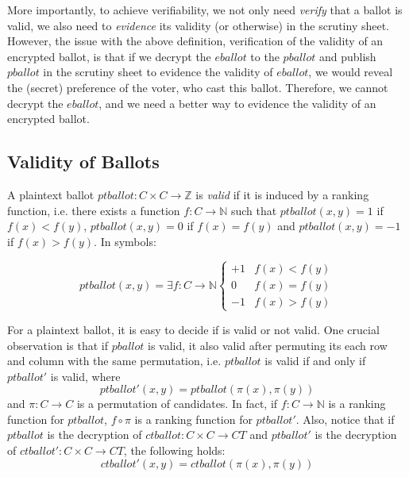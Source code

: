 \noindent
More importantly,  to achieve verifiability, we not only need \emph{verify}
that a ballot is valid, we also need to \emph{evidence} its validity
(or otherwise) in the scrutiny sheet.   However,  the issue with the above 
definition,  verification of the validity of an encrypted ballot, is that if we decrypt 
the $eballot$ to the $pballot$ and publish $pballot$  in the scrutiny sheet 
to evidence the validity of $eballot$,   
we would reveal the (secret) preference of the voter,  who cast this ballot. 
Therefore, we cannot decrypt the $eballot$, and we need a better way to evidence 
the validity of an encrypted ballot. 


\subsection{Validity of Ballots}
\label{sec:valid-pb}
A plaintext ballot $ptballot : C \times C \to \mathbb{Z}$ 
is \emph{valid} if it is induced by a ranking function, i.e.
there exists a function $f: C \to \mathbb{N}$ such that $ptballot(x, y) = 1$ if
$f(x) < f(y)$, $ptballot(x, y) = 0$ if $f(x) = f(y)$ and $ptballot(x, y) = -1$ if
$f(x) > f(y)$.  In symbols:

\[ ptballot(x, y) =  \exists f : C \to \mathbb{N}  \begin{cases} +1 & f(x) < f(y) \\ 0 &
f(x) = f(y) \\ -1 & f(x) > f(y) \end{cases} \]



\noindent
For a plaintext ballot, it is easy to decide if is valid 
or not valid.  One crucial observation is that if $pballot$ is valid, 
it also valid after permuting its each row and column with the 
same permutation, i.e.  $ptballot$ is valid if and only if $ptballot'$ is 
valid, where
\[ ptballot'(x,y) = ptballot(\pi(x), \pi(y)) \]
and $\pi: C \to C$ is a permutation of candidates.
In fact, if $f : C \to \mathbb{N}$ is a ranking function for $ptballot$, 
$f \circ \pi$ is a ranking function for $ptballot'$.   Also, notice that
if $ptballot$ is the decryption of  $ctballot : C \times C \to CT$
and $ptballot'$ is the decryption of $ctballot' : C \times C \to CT$,  
the following holds:
\[ ctballot'(x,y) = ctballot(\pi(x), \pi(y)) \]


